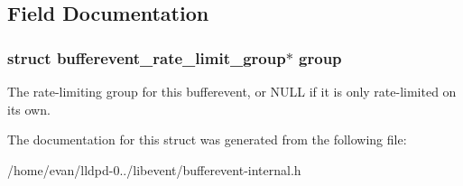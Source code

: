 \subsection{\-Field \-Documentation}
\subsubsection[{group}]{\setlength{\rightskip}{0pt plus 5cm}struct {\bf bufferevent\-\_\-rate\-\_\-limit\-\_\-group}$\ast$ {\bf group}}\label{structbufferevent__rate__limit_a794b60aaba3c4fd85426bc20dd2e37fb}
\-The rate-\/limiting group for this bufferevent, or \-N\-U\-L\-L if it is only rate-\/limited on its own. 

\-The documentation for this struct was generated from the following file\-:\begin{DoxyCompactItemize}
\item 
/home/evan/lldpd-\/0../libevent/bufferevent-\/internal.\-h\end{DoxyCompactItemize}
